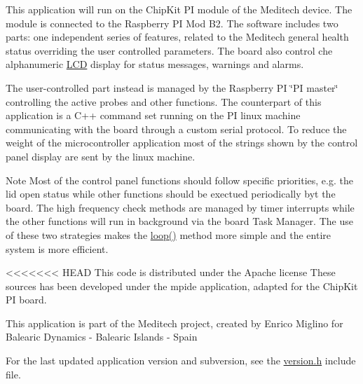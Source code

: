 This application will run on the Chip\-Kit P\-I module of the Meditech device. The module is connected to the Raspberry P\-I Mod B2. The software includes two parts\-: one independent series of features, related to the Meditech general health status overriding the user controlled parameters. The board also control che alphanumeric \hyperlink{class_l_c_d}{L\-C\-D} display for status messages, warnings and alarms. \par
The user-\/controlled part instead is managed by the Raspberry P\-I \char`\"{}\-P\-I master\char`\"{} controlling the active probes and other functions. The counterpart of this application is a C++ command set running on the P\-I linux machine communicating with the board through a custom serial protocol. To reduce the weight of the microcontroller application most of the strings shown by the control panel display are sent by the linux machine.

\begin{DoxyNote}{Note}
Most of the control panel functions should follow specific priorities, e.\-g. the lid open status while other functions should be exectued periodically byt the board. The high frequency check methods are managed by timer interrupts while the other functions will run in background via the board Task Manager. The use of these two strategies makes the \hyperlink{_meditech___chip_kit_control_panel_8pde_a0b33edabd7f1c4e4a0bf32c67269be2f}{loop()} method more simple and the entire system is more efficient.
\end{DoxyNote}
<<<<<<< HEAD
This code is distributed under the Apache license These sources has been developed under the mpide application, adapted for the Chip\-Kit P\-I board.\par
This application is part of the Meditech project, created by Enrico Miglino for Balearic Dynamics -\/ Balearic Islands -\/ Spain\par
For the last updated application version and subversion, see the \hyperlink{_version_8h}{version.\-h} include file.

